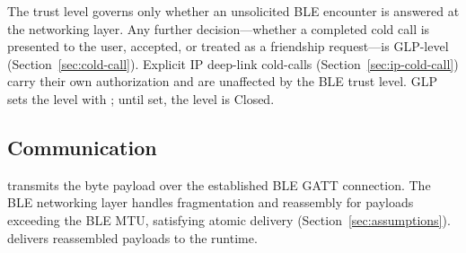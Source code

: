 The trust level governs only whether an unsolicited BLE encounter is answered at the networking layer.  Any further decision---whether a completed cold call is presented to the user, accepted, or treated as a friendship request---is GLP-level (Section~\ref{sec:cold-call}).  Explicit IP deep-link cold-calls (Section~\ref{sec:ip-cold-call}) carry their own authorization and are unaffected by the BLE trust level.  GLP sets the level with ; until set, the level is Closed.

\subsection{Communication}
\label{sec:ble-comm}
 transmits the byte payload over the established BLE GATT connection.  The BLE networking layer handles fragmentation and reassembly for payloads exceeding the BLE MTU, satisfying atomic delivery (Section~\ref{sec:assumptions}).   delivers reassembled payloads to the runtime.

\bigskip